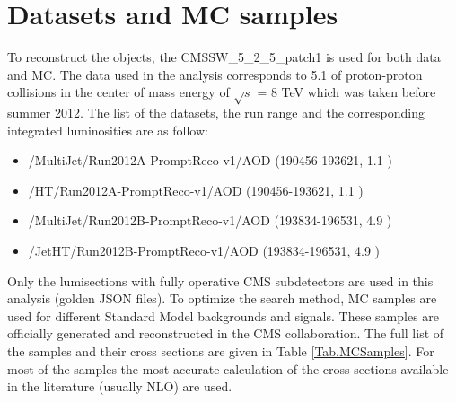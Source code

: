 \section{Datasets and MC samples}
\label{sect:dataMC}
To reconstruct the objects, the CMSSW\_5\_2\_5\_patch1 is used for both data and MC.
The data used in the analysis corresponds to 5.1 \invfb of proton-proton collisions in the center of mass energy of $\sqrt{s}$ = 8 TeV 
which was taken before summer 2012. The list of the datasets, the run range and the corresponding integrated luminosities are as follow:
\begin{itemize}
\item /MultiJet/Run2012A-PromptReco-v1/AOD (190456-193621, 1.1 \invfb)
\item /HT/Run2012A-PromptReco-v1/AOD (190456-193621, 1.1 \invfb)
\item /MultiJet/Run2012B-PromptReco-v1/AOD (193834-196531, 4.9 \invfb)
\item /JetHT/Run2012B-PromptReco-v1/AOD (193834-196531, 4.9 \invfb)
\end{itemize}

Only the lumisections with fully operative CMS subdetectors are used in this analysis (golden JSON files). To optimize the search method, MC 
samples are used for different Standard Model backgrounds and signals. These samples are officially generated and reconstructed in the CMS
collaboration. The full list of the samples and their cross sections are given in Table \ref{Tab.MCSamples}. For most of the samples the most 
accurate calculation of the cross sections available in the literature (usually NLO) are used.

